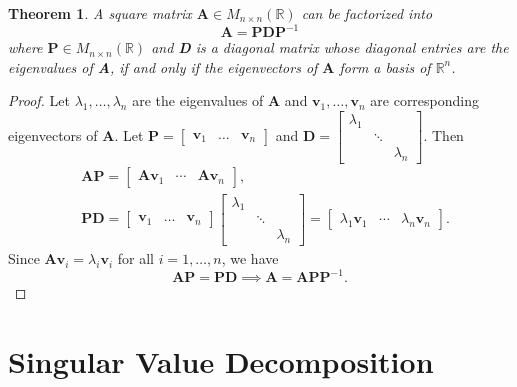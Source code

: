 \documentclass[12pt,openany]{book}
\newtheorem{theorem}{Theorem}[chapter]
\theoremstyle{definition}
\newcommand{\R}{\mathbb{R}}
\newcommand{\by}{\times}
\renewcommand{\vec}[1]{\textbf{#1}}
\begin{document}
	\begin{tcolorbox}[colframe=thmcolor,title={\color{white}\bf Eigendecomposition}]
		\begin{theorem}
			A square matrix $\textbf{A}\in M_{n\by n}(\R)$ can be factorized into \[
			\textbf{A}=\textbf{PDP}^{-1}
			\] where $\textbf{P}\in M_{n\by n}(\R)$ and \textbf{D} is a diagonal matrix whose diagonal entries are the eigenvalues of \textbf{A}, if and only if the eigenvectors of \(\textbf{A}\) form a basis of \(\R^n\).
		\end{theorem}
	\end{tcolorbox}
	\begin{proof}
		Let \(\lambda_1,\dots,\lambda_n\) are the eigenvalues of \(\textbf{A}\) and \(\vec{v}_1,\dots,\vec{v}_n\) are corresponding eigenvectors of \(\textbf{A}\). Let \(\textbf{P}=\begin{bmatrix}
			\vec{v}_1&\dots&\vec{v}_n
		\end{bmatrix}\) and \(\textbf{D}=\begin{bmatrix}
		\lambda_1 &&\\&\ddots&\\ &&\lambda_n
	\end{bmatrix}\). Then \begin{align*}
		&\textbf{AP}=\begin{bmatrix}
			\textbf{A}\vec{v}_1 &\cdots& \textbf{A}\vec{v}_n
		\end{bmatrix},\\
		&\textbf{PD}=\begin{bmatrix}
			\vec{v}_1&\dots&\vec{v}_n
		\end{bmatrix}\begin{bmatrix}
			\lambda_1 &&\\&\ddots&\\ &&\lambda_n
		\end{bmatrix}=\begin{bmatrix}
		\lambda_1\vec{v}_1&\cdots&\lambda_n\vec{v}_n
	\end{bmatrix}.
	\end{align*} Since \(\textbf{A}\vec{v}_i=\lambda_i\vec{v}_i\) for all \(i=1,\dots, n\), we have \[
	\textbf{AP}=\textbf{PD}\implies \textbf{A}=\textbf{A}\textbf{P}\textbf{P}^{-1}.
	\]
	\end{proof}

	\newpage
	\section{Singular Value Decomposition}
	
\end{document}
